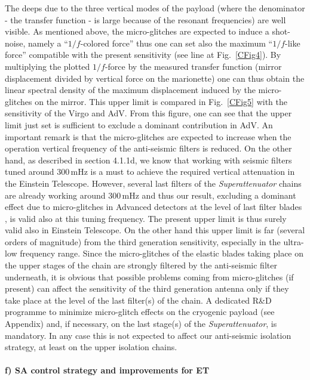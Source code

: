 The deeps due to the three vertical modes of the payload (where the denominator - the transfer function - is large because of the resonant frequencies) are well visible. As mentioned above, the micro-glitches are expected to induce a shot-noise, namely a ``$1/f$-colored force'' thus one can set also the maximum ``$1/f$-like force'' compatible with the present sensitivity (see line at Fig.~\ref{CFig4}). By multiplying the plotted $1/f$-force by the measured transfer function (mirror displacement divided by vertical force on the marionette) one can thus obtain the linear spectral density of the maximum displacement induced by the micro-glitches on the mirror. This upper limit is compared in Fig.~\ref{CFig5} with the sensitivity of the Virgo and AdV. From this figure, one can see that the upper limit just set is sufficient to exclude a dominant contribution in AdV. An important remark is that the micro-glitches are expected to increase when the operation vertical frequency of the anti-seismic filters is reduced. On the other hand, as described in section 4.1.1d, we know that working with seismic filters tuned around 300\,mHz is a must to achieve the required vertical attenuation in the Einstein Telescope. However, several last filters of the \emph{Superattenuator} chains are already working around 300\,mHz and thus our result, excluding a dominant effect due to micro-glitches in Advanced detectors at the level of last filter blades , is valid also at this tuning frequency. The present upper limit is thus surely valid also in Einstein Telescope. On the other hand this upper limit is far (several orders of magnitude) from the third generation sensitivity, especially in the ultra-low frequency range. Since the micro-glitches of the elastic blades taking place on the upper stages of the chain are strongly filtered by the anti-seismic filter underneath, it is obvious that possible problems coming from micro-glitches (if present) can affect the sensitivity of the third generation antenna only if they take place at the level of the last filter(s) of the chain. 
A dedicated R\&D programme to minimize micro-glitch effects on the cryogenic payload (see Appendix) and, if necessary, on the last stage(s) of the \emph{Superattenuator}, is mandatory. In any case this is not expected to affect our anti-seismic isolation strategy, at least on the upper isolation chains.

\paragraph{f) SA control strategy and improvements for ET}

